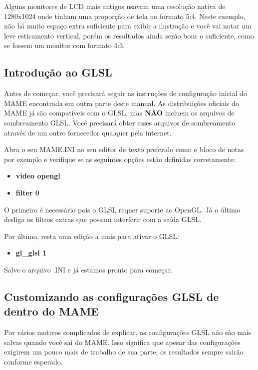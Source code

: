 \documentclass[letterpaper,10pt,brazil]{sphinxmanual}
\begin{document}
Alguns monitores de LCD mais antigos usavam uma resolução nativa de
1280x1024 onde tinham uma proporção de tela no formato 5:4.
Neste exemplo, não há muito espaço extra suficiente para exibir a
ilustração e você vai notar um leve esticamento vertical, porém os
resultados ainda serão bons o suficiente, como se fossem um monitor com
formato 4:3.


\subsection{Introdução ao GLSL}
\label{advanced/glsl:introducao-ao-glsl}
Antes de começar, você precisará seguir as instruções de configuração
inicial do MAME encontrada em outra parte deste manual.
As distribuições oficiais do MAME já são compatíveis com o GLSL, mas
\textbf{NÃO} incluem os arquivos de sombreamento GLSL. Você precisará obter
esses arquivos de sombreamento através de um outro fornecedor qualquer
pela internet.

Abra o seu MAME.INI no seu editor de texto preferido como o bloco de
notas por exemplo e verifique se as seguintes opções estão definidas
corretamente:
\begin{itemize}
\item {} 
\textbf{video opengl}

\item {} 
\textbf{filter 0}

\end{itemize}

O primeiro é necessário pois o GLSL requer suporte ao OpenGL. Já o
último desliga os filtros extras que possam interferir com a saída GLSL.

Por último, resta uma edição a mais para ativar o GLSL:
\begin{itemize}
\item {} 
\textbf{gl\_glsl 1}

\end{itemize}

Salve o arquivo .INI e já estamos pronto para começar.


\subsection{Customizando as configurações GLSL de dentro do MAME}
\label{advanced/glsl:customizando-as-configuracoes-glsl-de-dentro-do-mame}
Por vários motivos complicados de explicar, as configurações GLSL não
são mais salvas quando você sai do MAME. Isso significa que apesar das
configurações exigirem um pouco mais de trabalho de sua parte, os
resultados sempre sairão conforme esperado.
\end{document}

